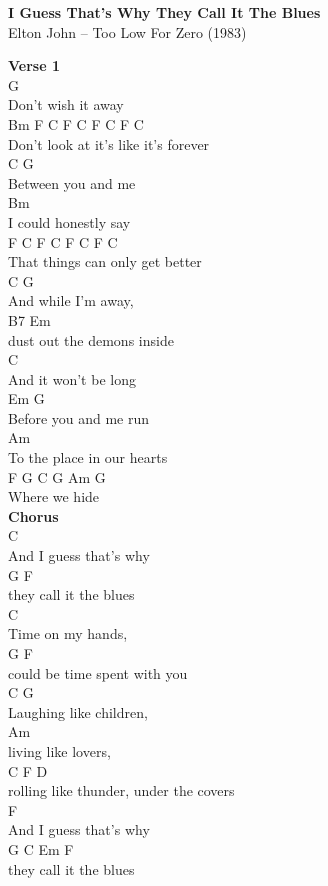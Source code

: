 \documentclass[a4paper]{article}
\begin{document}
    \begin{center}
        \textbf{I Guess That's Why They Call It The Blues}
        ~\\
        Elton John -- Too Low For Zero (1983)
    \end{center}
    {
        \scriptsize
        \textbf{Verse 1}
        ~\\
        {
            \cutive
            \obeyspaces
G
\\
Don't wish it away
\\
      Bm      F                 C    F C F C F C
\\
Don't look at it's like it's forever
\\
C               G
\\
Between you and me
\\
                 Bm
\\
I could honestly say
\\
     F                   C     F C F C F C
\\
That things can only get better
\\
    C          G
\\
And while I'm away,
\\
B7                    Em
\\
dust out the demons inside
\\
                C
\\
And it won't be long
\\
       Em         G
\\
Before you and me run
\\
                    Am
\\
To the place in our hearts
\\
F        G   C G Am G
\\
Where we hide
\\

        }
        \textbf{Chorus}
        ~\\
        {
            \cutive
            \obeyspaces
      C
\\
And I guess that's why
\\
     G           F
\\
they call it the blues
\\
           C
\\
Time on my hands,
\\
         G               F
\\
could be time spent with you
\\
C             G
\\
Laughing like children,
\\
            Am
\\
living like lovers,
\\
C            F                  D
\\
rolling like thunder, under the covers
\\
      F
\\
And I guess that's why
\\
     G           C    Em F
\\
they call it the blues
\\

}}
\end{document}
